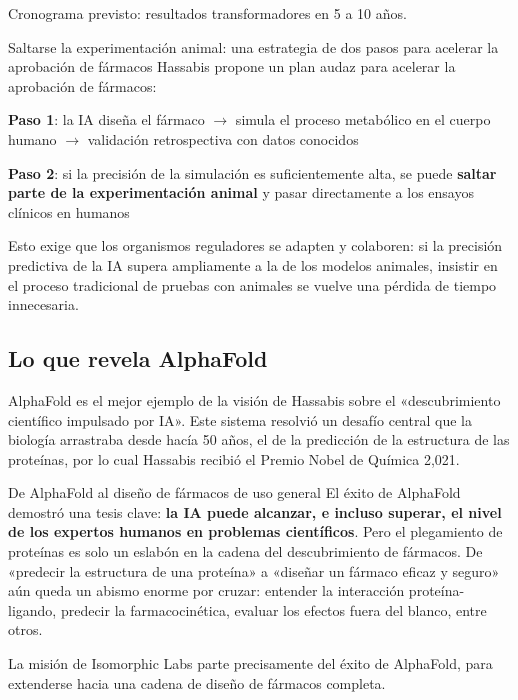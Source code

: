 Cronograma previsto: resultados transformadores en 5 a 10 años.

\begin{importantbox}{Saltarse la experimentación animal: una estrategia de dos pasos para acelerar la aprobación de fármacos}
Hassabis propone un plan audaz para acelerar la aprobación de fármacos:

\textbf{Paso 1}: la IA diseña el fármaco $\to$ simula el proceso metabólico en el cuerpo humano $\to$ validación retrospectiva con datos conocidos

\textbf{Paso 2}: si la precisión de la simulación es suficientemente alta, se puede \textbf{saltar parte de la experimentación animal} y pasar directamente a los ensayos clínicos en humanos

Esto exige que los organismos reguladores se adapten y colaboren: si la precisión predictiva de la IA supera ampliamente a la de los modelos animales, insistir en el proceso tradicional de pruebas con animales se vuelve una pérdida de tiempo innecesaria.
\end{importantbox}

\subsection{Lo que revela AlphaFold}

AlphaFold es el mejor ejemplo de la visión de Hassabis sobre el «descubrimiento científico impulsado por IA». Este sistema resolvió un desafío central que la biología arrastraba desde hacía 50 años, el de la predicción de la estructura de las proteínas, por lo cual Hassabis recibió el Premio Nobel de Química 2,021.

\begin{knowledgebox}{De AlphaFold al diseño de fármacos de uso general}
El éxito de AlphaFold demostró una tesis clave: \textbf{la IA puede alcanzar, e incluso superar, el nivel de los expertos humanos en problemas científicos}. Pero el plegamiento de proteínas es solo un eslabón en la cadena del descubrimiento de fármacos. De «predecir la estructura de una proteína» a «diseñar un fármaco eficaz y seguro» aún queda un abismo enorme por cruzar: entender la interacción proteína-ligando, predecir la farmacocinética, evaluar los efectos fuera del blanco, entre otros.

La misión de Isomorphic Labs parte precisamente del éxito de AlphaFold, para extenderse hacia una cadena de diseño de fármacos completa.
\end{knowledgebox}

